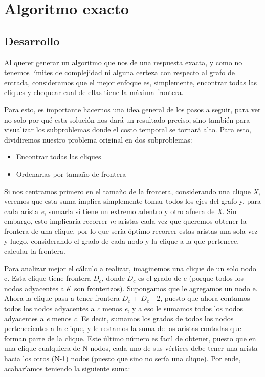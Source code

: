 \section{Algoritmo exacto}
\subsection{Desarrollo}
Al querer generar un algoritmo que nos de una respuesta exacta, y como no tenemos límites de complejidad ni alguna certeza con respecto al grafo de entrada, consideramos que el mejor enfoque es, simplemente, encontrar todas las cliques y chequear cual de ellas tiene la máxima frontera.

Para esto, es importante hacernos una idea general de los pasos a seguir, para ver no solo por qué esta solución nos dará un resultado preciso, sino también para visualizar los subproblemas donde el costo temporal se tornará alto. Para esto, dividiremos nuestro problema original en dos subproblemas:
\begin{itemize}
	\item Encontrar todas las cliques
	
	\item Ordenarlas por tamaño de frontera

\end{itemize}

Si nos centramos primero en el tamaño de la frontera, considerando una clique \textit{X}, veremos que esta suma implica simplemente tomar todos los ejes del grafo y, para cada arista \textit{e}, sumarla si tiene un extremo adentro y otro afuera de \textit{X}. Sin embargo, esto implicaría recorrer \textit{m} aristas cada vez que queremos obtener la frontera de una clique, por lo que sería óptimo recorrer estas aristas una sola vez y luego, considerando el grado de cada nodo y la clique a la que pertenece, calcular la frontera.

Para analizar mejor el cálculo a realizar, imaginemos una clique de un solo nodo c. Esta clique tiene frontera ${D_c}$, donde ${D_c}$ es el grado de c (porque todos los nodos adyacentes a él son fronterizos). Supongamos que le agregamos un nodo e. Ahora la clique pasa a tener frontera ${D_c}$ + ${D_e}$ - 2, puesto que ahora contamos todos los nodos adyacentes a \textit{c} menos \textit{e}, y a eso le sumamos todos los nodos adyacentes a \textit{e} menos \textit{c}. Es decir, sumamos los grados de todos los nodos pertenecientes a la clique, y le restamos la suma de las aristas contadas que forman parte de la clique. Este último número es facil de obtener, puesto que en una clique cualquiera de N nodos, cada uno de sus vértices debe tener una arista hacia los otros (N-1) nodos (puesto que sino no sería una clique). Por ende, acabaríamos teniendo la siguiente suma:

